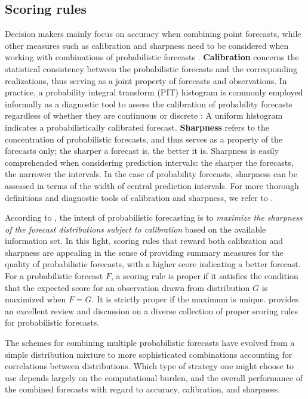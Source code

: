 \documentclass[a4paper,11pt]{article}
\begin{document}
\subsection{Scoring rules}
\label{sec:issues}

Decision makers mainly focus on accuracy when combining point forecasts, while other measures such as calibration and sharpness need to be considered when working with combinations of probabilistic forecasts \citep{Gneiting2007-fr,Gneiting2007-ij,Lahiri2015-qq}. \textbf{Calibration} concerns the statistical consistency between the probabilistic forecasts and the corresponding realizations, thus serving as a joint property of forecasts and observations. In practice, a probability integral transform (PIT) histogram is commonly employed informally as a diagnostic tool to assess the calibration of probability forecasts regardless of whether they are continuous \citep{Dawid1984-vp,Diebold1998-cr} or discrete \citep{Gneiting2013-hl}: A uniform histogram indicates a probabilistically calibrated forecast. \textbf{Sharpness} refers to the concentration of probabilistic forecasts, and thus serves as a property of the forecasts only; the sharper a forecast is, the better it is. Sharpness is easily comprehended when considering prediction intervals: the sharper the forecasts, the narrower the intervals. In the case of probability forecasts, sharpness can be assessed in terms of the width of central prediction intervals. For more thorough definitions and diagnostic tools of calibration and sharpness, we refer to \citet{Gneiting2014-tz}.

According to \citet{Gneiting2007-fr}, the intent of probabilistic forecasting is to \textit{maximize the sharpness of the forecast distributions subject to calibration} based on the available information set. In this light, scoring rules that reward both calibration and sharpness are appealing in the sense of providing summary measures for the quality of probabilistic forecasts, with a higher score indicating a better forecast. For a probabilistic forecast $F$, a scoring rule is proper if it satisfies the condition that the expected score for an observation drawn from distribution $G$ is maximized when $F=G$. It is strictly proper if the maximum is unique. \citet{Gneiting2007-ij} provides an excellent review and discussion on a diverse collection of proper scoring rules for probabilistic forecasts.

The schemes for combining multiple probabilistic forecasts have evolved from a simple distribution mixture to more sophisticated combinations accounting for correlations between distributions. Which type of strategy one might choose to use depends largely on the computational burden, and the overall performance of the combined forecasts with regard to accuracy, calibration, and sharpness.
\end{document}
